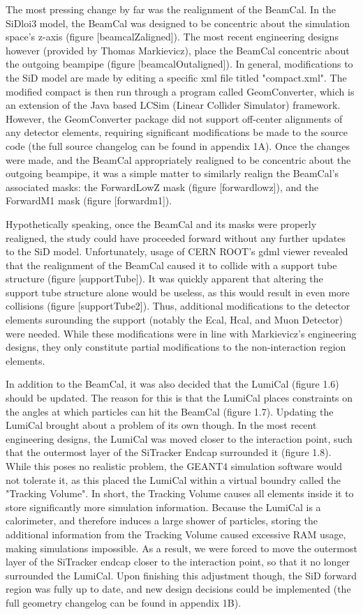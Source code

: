 \documentclass{report}
\begin{document}
            The most pressing change by far was the realignment of the BeamCal. In the SiDloi3 model, the BeamCal was designed to be concentric about the simulation space's z-axis (figure [beamcalZaligned]). The most recent engineering designs however (provided by Thomas Markievicz), place the BeamCal concentric about the outgoing beampipe (figure [beamcalOutaligned]). In general, modifications to the SiD model are made by editing a specific xml file titled "compact.xml". The modified compact is then run through a program called GeomConverter, which is an extension of the Java based LCSim (Linear Collider Simulator) framework. However, the GeomConverter package did not support off-center alignments of any detector elements, requiring significant modifications be made to the source code (the full source changelog can be found in appendix 1A). Once the changes were made, and the BeamCal appropriately realigned to be concentric about the outgoing beampipe, it was a simple matter to similarly realign the BeamCal's associated masks: the ForwardLowZ mask (figure [forwardlowz]), and the ForwardM1 mask (figure [forwardm1]). 

            Hypothetically speaking, once the BeamCal and its masks were properly realigned, the study could have proceeded forward without any further updates to the SiD model. Unfortunately, usage of CERN ROOT's gdml viewer revealed that the realignment of the BeamCal caused it to collide with a support tube structure (figure [supportTube]). It was quickly apparent that altering the support tube structure alone would be useless, as this would result in even more collisions (figure [supportTube2]). Thus, additional modifications to the detector elements surounding the support (notably the Ecal, Hcal, and Muon Detector) were needed. While these modifications were in line with Markievicz's engineering designs, they only constitute partial modifications to the non-interaction region elements.

            In addition to the BeamCal, it was also decided that the LumiCal (figure 1.6) should be updated. The reason for this is that the LumiCal places constraints on the angles at which particles can hit the BeamCal (figure 1.7). Updating the LumiCal brought about a problem of its own though. In the most recent engineering designs, the LumiCal was moved closer to the interaction point, such that the outermost layer of the SiTracker Endcap surrounded it (figure 1.8). While this poses no realistic problem, the GEANT4 simulation software would not tolerate it, as this placed the LumiCal within a virtual boundry called the "Tracking Volume". In short, the Tracking Volume causes all elements inside it to store significantly more simulation information. Because the LumiCal is a calorimeter, and therefore induces a large shower of particles, storing the additional information from the Tracking Volume caused excessive RAM usage, making simulations impossible. As a result, we were forced to move the outermost layer of the SiTracker endcap closer to the interaction point, so that it no longer surrounded the LumiCal. Upon finishing this adjustment though, the SiD forward region was fully up to date, and new design decisions could be implemented (the full geometry changelog can be found in appendix 1B).
\end{document}

